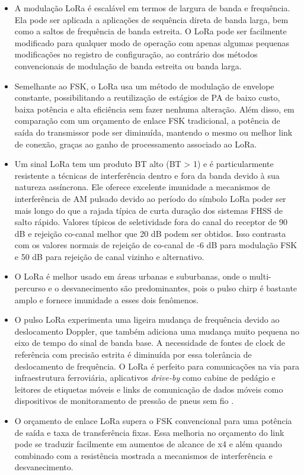 \documentclass[
	12pt,				%
	openright,			%
	twoside,			%
	a4paper,			%
	english,			%
	french,				%
	spanish,			%
	brazil				%
	]{abntex2}
\begin{document}
\begin{itemize}
    \item A modulação LoRa é escalável em termos de largura de banda e frequência. Ela pode ser aplicada a aplicações de sequência direta de banda larga, bem como a saltos de frequência de banda estreita. O LoRa pode ser facilmente modificado para qualquer modo de operação com apenas algumas pequenas modificações no registro de configuração, ao contrário dos métodos convencionais de modulação de banda estreita ou banda larga.
    \item Semelhante ao FSK, o LoRa usa um método de modulação de envelope constante, possibilitando a reutilização de estágios de PA de baixo custo, baixa potência e alta eficiência sem fazer nenhuma alteração. Além disso, em comparação com um orçamento de enlace FSK tradicional, a potência de saída do transmissor pode ser diminuída, mantendo o mesmo ou melhor link de conexão, graças ao ganho de processamento associado ao LoRa.
    \item Um sinal LoRa tem um produto BT alto (BT > 1) e é particularmente resistente a técnicas de interferência dentro e fora da banda devido à sua natureza assíncrona. Ele oferece excelente imunidade a mecanismos de interferência de AM pulsado devido ao período do símbolo LoRa poder ser mais longo do que a rajada típica de curta duração dos sistemas FHSS de salto rápido. Valores típicos de seletividade fora do canal do receptor de 90 dB e rejeição co-canal melhor que 20 dB podem ser obtidos. Isso contrasta com os valores normais de rejeição de co-canal de -6 dB para modulação FSK e 50 dB para rejeição de canal vizinho e alternativo.
    \item O LoRa é melhor usado em áreas urbanas e suburbanas, onde o multi-percurso e o desvanecimento são predominantes, pois o pulso chirp é bastante amplo e fornece imunidade a esses dois fenômenos.
    \item O pulso LoRa experimenta uma ligeira mudança de frequência devido ao deslocamento Doppler, que também adiciona uma mudança muito pequena no eixo de tempo do sinal de banda base. A necessidade de fontes de clock de referência com precisão estrita é diminuída por essa tolerância de deslocamento de frequência. O LoRa é perfeito para comunicações na via para infraestrutura ferroviária, aplicativos \emph{drive-by} como cabine de pedágio e leitores de etiquetas móveis e links de comunicação de dados móveis como dispositivos de monitoramento de pressão de pneus sem fio \cite{semtech_2015}.
    \item O orçamento de enlace LoRa supera o FSK convencional para uma potência de saída e taxa de transferência fixas. Essa melhoria no orçamento do link pode se traduzir facilmente em aumentos de alcance de x4 e além quando combinado com a resistência mostrada a mecanismos de interferência e desvanecimento.

\end{itemize}
\end{document}

